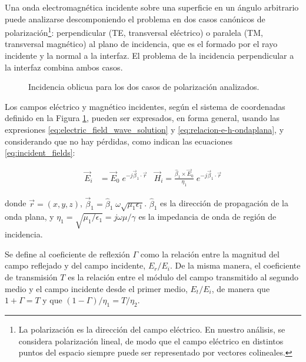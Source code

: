 Una onda electromagnética incidente sobre una superficie en un ángulo arbitrario puede analizarse descomponiendo el problema en dos casos canónicos de polarización\footnote{La polarización es la dirección del campo eléctrico. En nuestro análisis, se considera polarización lineal, de modo que el campo eléctrico en distintos puntos del espacio siempre puede ser representado por vectores colineales.}: perpendicular (TE, transversal eléctrico) o paralela (TM, transversal magnético) al plano de incidencia, que es el formado por el rayo incidente y la normal a la interfaz. El problema de la incidencia perpendicular a la interfaz combina ambos casos.

\begin{figure} [H]
	\centering 
	\hspace{5mm}
	\caption{Incidencia oblicua para los dos casos de polarización analizados.}
	\label{fig:oblique_incidence}
\end{figure}

Los campos eléctrico y magnético incidentes, según el sistema de coordenadas definido en la Figura \ref{fig:oblique_incidence}, pueden ser expresados, en forma general, usando las expresiones \ref{eq:electric_field_wave_solution} y \ref{eq:relacion-e-h-ondaplana}, y considerando que no hay pérdidas, como indican las ecuaciones \ref{eq:incident_fields}:

\begin{align}
	\label{eq:incident_fields}
	\vec{E}_i &= \vec{E}_0 \;e^{-j\vec{\beta}_1 \cdot \vec{r}} &
	\vec{H}_i = \frac{\hat{\beta}_1 \times \vec{E}_0}{\eta_1} \;e^{-j\vec{\beta}_1 \cdot \vec{r}}
\end{align}

donde $\vec{r}=(x,y,z)$, $\vec{\beta}_1 = \hat{\beta}_1 \;\omega \sqrt{\mu_1 \epsilon_1}$. $\hat{\beta}_1$ es la dirección de propagación de la onda plana, y $\eta_1 = \sqrt{\mu_1 / \epsilon_1} = j\omega \mu / \gamma$ es la impedancia de onda de región de incidencia.

Se define al coeficiente de reflexión $\Gamma$ como la relación entre la magnitud del campo reflejado y del campo incidente, $E_r / E_i$. De la misma manera, el coeficiente de transmisión $T$ es la relación entre el módulo del campo transmitido al segundo medio y el campo incidente desde el primer medio, $E_t / E_i$, de manera que $1+\Gamma = T$ y que $(1-\Gamma)/\eta_1 = T/\eta_2$. 

